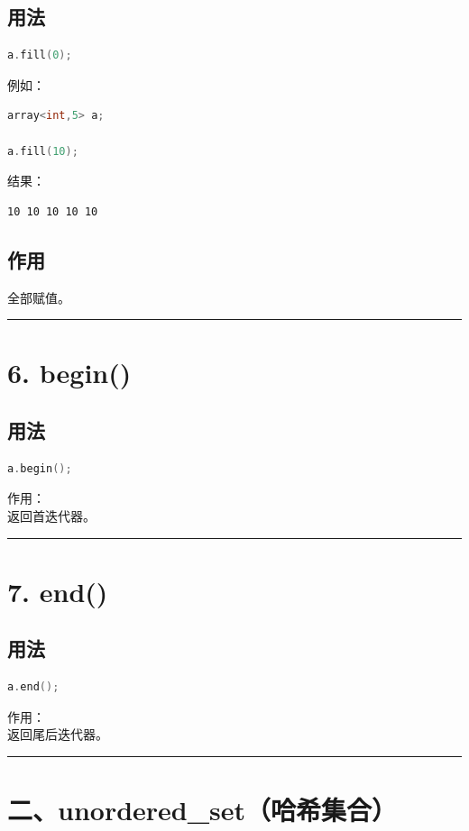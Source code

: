 \documentclass[10pt,twocolumn]{extarticle}
\begin{document}
\subsection{用法}
\begin{lstlisting}[language=C++]
a.fill(0);
\end{lstlisting}
例如：
\begin{lstlisting}[language=C++]
array<int,5> a;

a.fill(10);
\end{lstlisting}
结果：
\begin{lstlisting}
10 10 10 10 10
\end{lstlisting}

\subsection{作用}
全部赋值。

\noindent\rule{\linewidth}{0.4pt}

\section{6. begin()}

\subsection{用法}
\begin{lstlisting}[language=C++]
a.begin();
\end{lstlisting}
作用：\\
返回首迭代器。

\noindent\rule{\linewidth}{0.4pt}

\section{7. end()}

\subsection{用法}
\begin{lstlisting}[language=C++]
a.end();
\end{lstlisting}
作用：\\
返回尾后迭代器。

\noindent\rule{\linewidth}{0.4pt}

\section{二、unordered\_set（哈希集合）}
\end{document}
